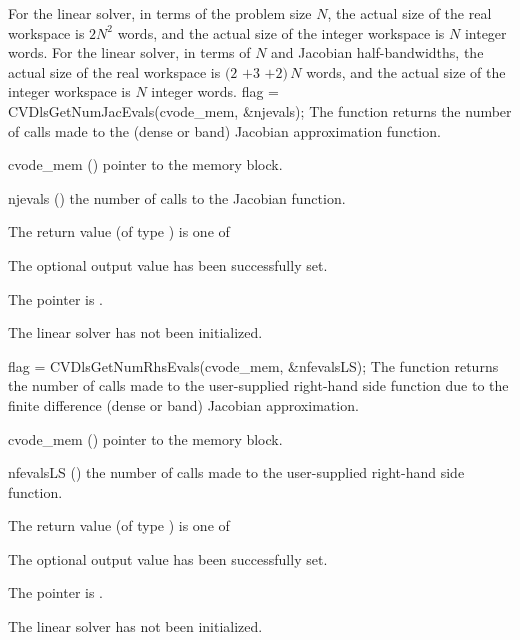 {
  For the {\cvdense} linear solver, in terms of the problem size $N$, 
  the actual size of the real workspace is $2N^2$  words, 
  and the actual size of the integer workspace is $N$ integer words.
  For the {\cvband} linear solver, in terms of $N$ 
  and Jacobian half-bandwidths, the actual size of the real workspace is
  $(2$ $+ 3$ $+ 2)\, N$  words,
  and the actual size of the integer workspace is $N$ integer words.
}
{
  flag = CVDlsGetNumJacEvals(cvode\_mem, \&njevals);
}
{
  The function  returns the
  number of calls made to the {\cvdls} (dense or band) 
  Jacobian approximation function.
}
{
  \begin{args}
  \item[cvode\_mem] ()
    pointer to the {\cvode} memory block.
  \item[njevals] ()
    the number of calls to the Jacobian function.
  \end{args}
}
{
  The return value  (of type ) is one of
  \begin{args}
  \item[\Id{CVDLS\_SUCCESS}] 
    The optional output value has been successfully set.
  \item[\Id{CVDLS\_MEM\_NULL}]
    The  pointer is .
  \item[\Id{CVDLS\_LMEM\_NULL}]
    The {\cvdls} linear solver has not been initialized.
  \end{args}
}
{}
{
  flag = CVDlsGetNumRhsEvals(cvode\_mem, \&nfevalsLS);
}
{
  The function  returns the
  number of calls made to the user-supplied right-hand side function due to the 
  finite difference (dense or band) Jacobian approximation.
}
{
  \begin{args}
  \item[cvode\_mem] ()
    pointer to the {\cvode} memory block.
  \item[nfevalsLS] ()
    the number of calls made to the user-supplied right-hand side function.
  \end{args}
}
{
  The return value  (of type ) is one of
  \begin{args}
  \item[\Id{CVDLS\_SUCCESS}] 
    The optional output value has been successfully set.
  \item[\Id{CVDLS\_MEM\_NULL}]
    The  pointer is .
  \item[\Id{CVDLS\_LMEM\_NULL}]
    The {\cvdls} linear solver has not been initialized.
  \end{args}
}
